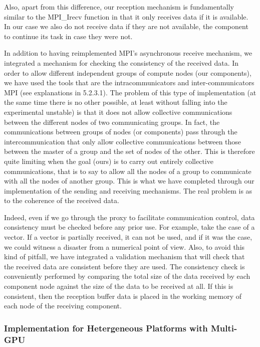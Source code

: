 Also, apart from this difference, our reception mechanism is fundamentally similar to the MPI\_Irecv function in that it only receives data if it is available. In our case we also do not receive data if they are not available, the component to continue its task in case they were not. 

In addition to having reimplemented MPI's asynchronous receive mechanism, we integrated a mechanism for checking the consistency of the received data. In order to allow different independent groups of compute nodes (our components), we have used the tools that are the intracommunicators and inter-communicators MPI (see explanations in 5.2.3.1). The problem of this type of implementation (at the same time there is no other possible, at least without falling into the experimental unstable) is that it does not allow collective communications between the different nodes of two communicating groups. In fact, the communications between groups of nodes (or components) pass through the intercommunication that only allow collective communications between those between the master of a group and the set of nodes of the other. This is therefore quite limiting when the goal (ours) is to carry out entirely collective communications, that is to say to allow all the nodes of a group to communicate with all the nodes of another group. This is what we have completed through our implementation of the sending and receiving mechanisms. The real problem is as to the coherence of the received data.

Indeed, even if we go through the proxy to facilitate communication control, data consistency must be checked before any prior use. For example, take the case of a vector. If a vector is partially received, it can not be used, and if it was the case, we could witness a disaster from a numerical point of view. Also, to avoid this kind of pitfall, we have integrated a validation mechanism that will check that the received data are consistent before they are used. The consistency check is conveniently performed by comparing the total size of the data received by each component node against the size of the data to be received at all. If this is consistent, then the reception buffer data is placed in the working memory of each node of the receiving component.

\subsubsection{Implementation for Hetergeneous Platforms with Multi-GPU}

